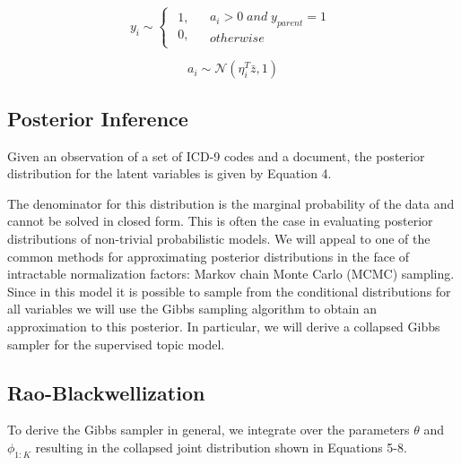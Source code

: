 \documentclass{article}
\begin{document}
\begin{equation}
y_{i}\sim\begin{cases}
\begin{array}{c}
1,\\
0,\end{array} & \begin{array}{c}
a_{i}>0\; and\; y_{parent}=1\\
otherwise\end{array}\end{cases}\end{equation}


\begin{equation}
a_{i}\sim\mathcal{N}\left(\eta_{i}^{T}\bar{z},1\right)\end{equation}



\subsection{Posterior Inference}

Given an observation of a set of ICD-9 codes and a document, the posterior
distribution for the latent variables is given by Equation 4.

The denominator for this distribution is the marginal probability
of the data and cannot be solved in closed form. This is often the
case in evaluating posterior distributions of non-trivial probabilistic
models. We will appeal to one of the common methods for approximating
posterior distributions in the face of intractable normalization factors:
Markov chain Monte Carlo (MCMC) sampling. Since in this model it is
possible to sample from the conditional distributions for all variables
we will use the Gibbs sampling algorithm to obtain an approximation
to this posterior. In particular, we will derive a collapsed Gibbs
sampler for the supervised topic model.


\subsection{Rao-Blackwellization}

To derive the Gibbs sampler in general, we integrate over the parameters
$\theta$ and $\phi_{1:K}$ resulting in the collapsed joint distribution
shown in Equations 5-8.
\end{document}

